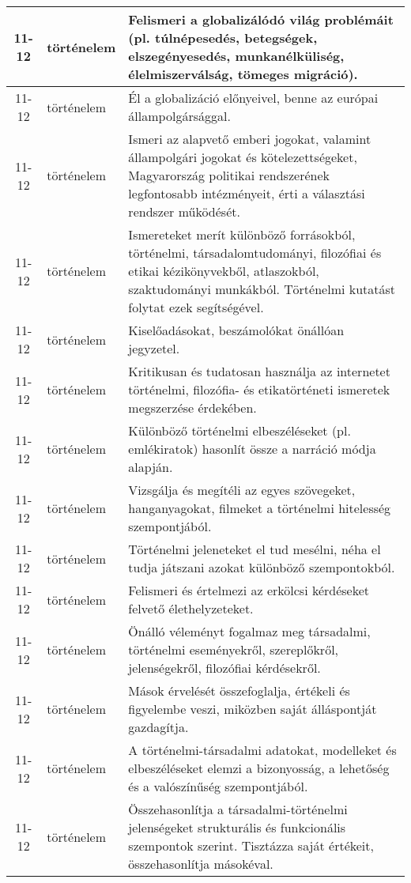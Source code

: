 \begin{small}
\begin{longtable}{c | p{2cm} |  p{11cm} }
              11-12 & történelem & Felismeri a globalizálódó világ problémáit (pl. túlnépesedés, betegségek, elszegényesedés, munkanélküliség, élelmiszerválság, tömeges migráció). \\ \hline
              11-12 & történelem & Él a globalizáció előnyeivel, benne az európai állampolgársággal. \\ \hline
              11-12 & történelem & Ismeri az alapvető emberi jogokat, valamint állampolgári jogokat és kötelezettségeket, Magyarország politikai rendszerének legfontosabb intézményeit, érti a választási rendszer működését. \\ \hline
              11-12 & történelem & Ismereteket merít különböző forrásokból, történelmi, társadalomtudományi, filozófiai és etikai kézikönyvekből, atlaszokból, szaktudományi munkákból. Történelmi kutatást folytat ezek segítségével. \\ \hline
              11-12 & történelem & Kiselőadásokat, beszámolókat önállóan jegyzetel. \\ \hline
              11-12 & történelem & Kritikusan és tudatosan használja az internetet történelmi, filozófia- és etikatörténeti ismeretek megszerzése érdekében. \\ \hline
              11-12 & történelem & Különböző történelmi elbeszéléseket (pl. emlékiratok) hasonlít össze a narráció módja alapján. \\ \hline
              11-12 & történelem & Vizsgálja és megítéli az egyes szövegeket, hanganyagokat, filmeket a történelmi hitelesség szempontjából. \\ \hline
              11-12 & történelem & Történelmi jeleneteket el tud mesélni, néha el tudja játszani azokat különböző szempontokból. \\ \hline
              11-12 & történelem & Felismeri és értelmezi az erkölcsi kérdéseket felvető élethelyzeteket. \\ \hline
              11-12 & történelem & Önálló véleményt fogalmaz meg társadalmi, történelmi eseményekről, szereplőkről, jelenségekről, filozófiai kérdésekről. \\ \hline
              11-12 & történelem & Mások érvelését összefoglalja, értékeli és figyelembe veszi, miközben saját álláspontját gazdagítja. \\ \hline
              11-12 & történelem & A történelmi-társadalmi adatokat, modelleket és elbeszéléseket elemzi a bizonyosság, a lehetőség és a valószínűség szempontjából. \\ \hline
              11-12 & történelem & Összehasonlítja a társadalmi-történelmi jelenségeket strukturális és funkcionális szempontok szerint. Tisztázza saját értékeit, összehasonlítja másokéval. \\ \hline

\end{longtable}
\end{small}
